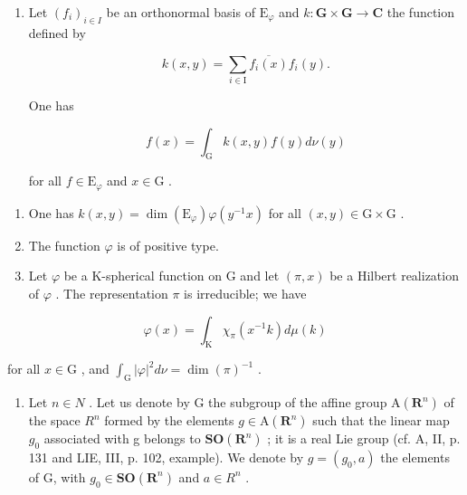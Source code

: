 \begin{enumerate}
\def\labelenumi{\alph{enumi})}
\setcounter{enumi}{3}
\tightlist
\item
  Let \((f_i)_{i\in I}\) be an orthonormal basis of \(\mathrm{E}_{\varphi}\) and \(k\colon \mathbf{G}\times \mathbf{G}\to \mathbf{C}\) the function defined by

\[
k (x, y) = \sum_ {i \in \mathrm{I}} \overline {{f _ {i} (x)}} f _ {i} (y).
\]

One has

\[
f (x) = \int_ {\mathrm{G}} k (x, y) f (y) d \nu (y)
\]

for all \(f \in \mathrm{E}_{\varphi}\) and \(x \in \mathrm{G}\) .

\end{enumerate}

\begin{enumerate}
\def\labelenumi{\alph{enumi})}
\setcounter{enumi}{4}
\item
  One has \(k(x,y)=\dim(\mathrm{E}_{\varphi})\varphi(y^{-1}x)\) for all \((x,y)\in\mathrm{G}\times\mathrm{G}\) .
\item
  The function \(\varphi\) is of positive type.
\item
  Let \(\varphi\) be a K-spherical function on G and let \((\pi, x)\) be a Hilbert realization of \(\varphi\) . The representation \(\pi\) is irreducible; we have
\end{enumerate}

\[
\varphi (x) = \int_ {\mathrm{K}} \chi_ {\pi} (x ^ {- 1} k) d \mu (k)
\]

for all \(x \in \mathrm{G}\) , and \(\int_{\mathrm{G}} |\varphi|^2 d\nu = \dim(\pi)^{-1}\) .

\begin{enumerate}
\def\labelenumi{\arabic{enumi})}
\setcounter{enumi}{29}
\tightlist
\item
  Let \(n \in N\) . Let us denote by G the subgroup of the affine group \(\mathrm{A}(\mathbf{R}^{n})\) of the space \(R^{n}\) formed by the elements \(g \in \mathrm{A}(\mathbf{R}^{n})\) such that the linear map \(g_{0}\) associated with g belongs to \(\mathbf{SO}(\mathbf{R}^{n})\) ; it is a real Lie group (cf. A, II, p. 131 and LIE, III, p. 102, example). We denote by \(g = (g_{0}, a)\) the elements of G, with \(g_{0} \in \mathbf{SO}(\mathbf{R}^{n})\) and \(a \in R^{n}\) .
\end{enumerate}

